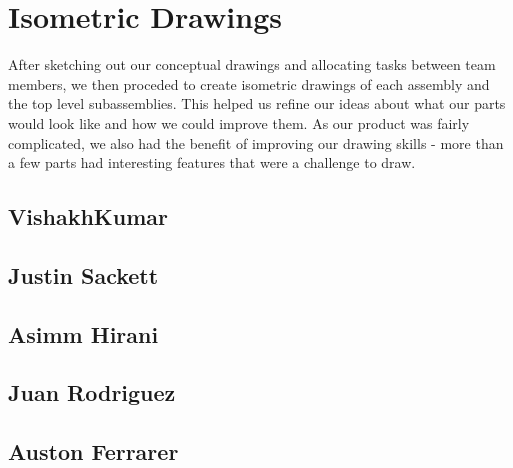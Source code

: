 \section{Isometric Drawings}
After sketching out our conceptual drawings and allocating tasks between team members, we then proceded to create isometric drawings of each assembly and the top level subassemblies.
This helped us refine our ideas about what our parts would look like and how we could improve them.
As our product was fairly complicated, we also had the benefit of improving our drawing skills - more than a few parts had interesting features that were a challenge to draw.

\subsection{VishakhKumar}

\subsection{Justin Sackett}

\subsection{Asimm Hirani}

\subsection{Juan Rodriguez}

\subsection{Auston Ferrarer}
